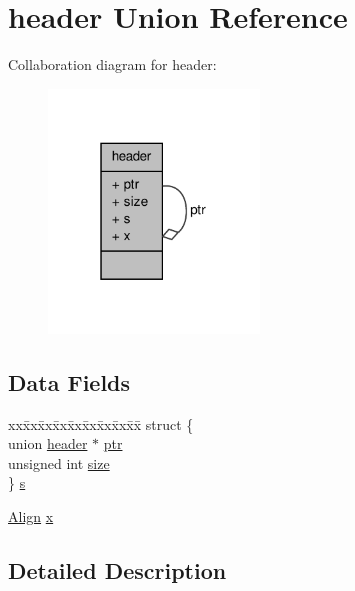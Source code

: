 \hypertarget{unionheader}{\section{header \-Union \-Reference}
\label{unionheader}
}


\-Collaboration diagram for header\-:
\nopagebreak
\begin{figure}[H]
\begin{center}
\leavevmode
\includegraphics[width=159pt]{unionheader__coll__graph}
\end{center}
\end{figure}
\subsection*{\-Data \-Fields}
\begin{DoxyCompactItemize}
\item 
\begin{tabbing}
xx\=xx\=xx\=xx\=xx\=xx\=xx\=xx\=xx\=\kill
struct \{\\
\>union \hyperlink{unionheader}{header} $\ast$ \hyperlink{unionheader_a0e84d7fb56aa45d0a3eb7083a5ff1b63}{ptr}\\
\>unsigned int \hyperlink{unionheader_aac913b3a1f6ef005d66bf7a84428773e}{size}\\
\} \hyperlink{unionheader_a958d7cb7719f42c07c1a600553d0db44}{s}\\

\end{tabbing}\item 
\hyperlink{mm_8c_aa508dd61e627680e57643837d292d89f}{\-Align} \hyperlink{unionheader_a5f369a9edd645986a45d0c159773c740}{x}
\end{DoxyCompactItemize}


\subsection{\-Detailed \-Description}


